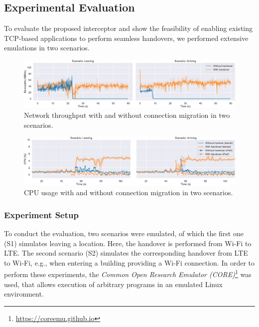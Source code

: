 \subsection{Experimental Evaluation}
To evaluate the proposed interceptor and show the feasibility of enabling existing TCP-based applications to perform seamless handovers, we performed extensive emulations in two scenarios.


\begin{figure}[tb]
    \centering
    \includegraphics[width=\textwidth]{figures/migration/wg_migration-network.pdf}
    \caption{Network throughput with and without connection migration in two scenarios.}
    \label{fig:eval:mig:network}
\end{figure}
\begin{figure}[tb]
    \centering
    \includegraphics[width=\textwidth]{figures/migration/wg_migration-cpu.pdf}
    \caption{CPU usage with and without connection migration in two scenarios.}
    \label{fig:eval:mig:cpu}
\end{figure}


\subsubsection{Experiment Setup}
To conduct the evaluation, two scenarios were emulated, of which the first one (S1) simulates leaving a location.
Here, the handover is performed from Wi-Fi to LTE.
The second scenario (S2) simulates the corresponding handover from LTE to Wi-Fi, e.g., when entering a building providing a Wi-Fi connection.
In order to perform these experiments, the \emph{Common Open Research Emulator (CORE)}\footnote{\url{https://coreemu.github.io}} was used, that allows execution of arbitrary programs in an emulated Linux environment.


